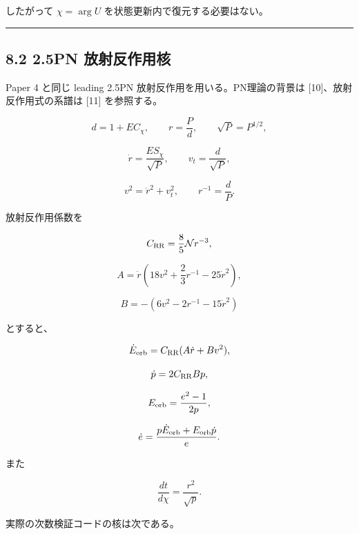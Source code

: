 \documentclass[
  a4paper,
]{ltjsarticle}
\begin{document}
したがって \(\chi=\arg U\) を状態更新内で復元する必要はない。

\begin{center}\rule{0.5\linewidth}{0.5pt}\end{center}

\subsection{8.2 2.5PN
放射反作用核}\label{pn-ux653eux5c04ux53cdux4f5cux7528ux6838}

Paper 4 と同じ leading 2.5PN 放射反作用を用いる。PN理論の背景は
{[}10{]}、放射反作用式の系譜は {[}11{]} を参照する。

\[
d=1+EC_\chi,
\qquad
r=\frac Pd,
\qquad
\sqrt P=P^{1/2},
\]

\[
\dot r=\frac{ES_\chi}{\sqrt P},
\qquad
v_t=\frac d{\sqrt P},
\]

\[
v^2=\dot r^2+v_t^2,
\qquad
r^{-1}=\frac dP.
\]

放射反作用係数を

\[
C_{\rm RR}=\frac85\mathcal N r^{-3},
\]

\[
A
=\dot r
\left(
18v^2+\frac23r^{-1}-25\dot r^2
\right),
\]

\[
B
=-\left(
6v^2-2r^{-1}-15\dot r^2
\right)
\]

とすると、

\[
\dot E_{\rm orb}
=C_{\rm RR}(A\dot r+Bv^2),
\]

\[
\dot p=2C_{\rm RR}Bp,
\]

\[
E_{\rm orb}=\frac{e^2-1}{2p},
\]

\[
\dot e
=\frac{p\dot E_{\rm orb}+E_{\rm orb}\dot p}{e}.
\]

また

\[
\frac{dt}{d\chi}
=\frac{r^2}{\sqrt p}.
\]

実際の次数検証コードの核は次である。
\end{document}
